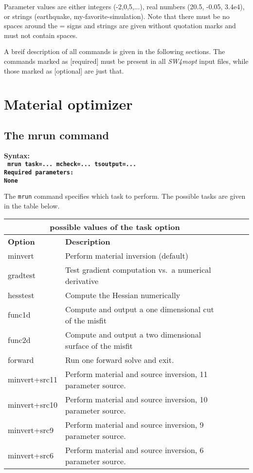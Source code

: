 \documentclass[12pt]{report}
\begin{document}
Parameter values are either integers (-2,0,5,...), real numbers (20.5, -0.05, 3.4e4), or strings
(earthquake, my-favorite-simulation). Note that there must be no spaces around the = signs and
strings are given without quotation marks and must not contain spaces. 

A breif description of all commands is given in the following sections. The commands marked as
[required] must be present in all \emph{SW4mopt} input files, while those marked as [optional] are just
that. 

\section{Material optimizer}

\subsection{The mrun command}\label{sec:mrun}
\begin{flushleft}\bf
Syntax:\\
\tt
mrun task=... mcheck=... tsoutput=... 
\\
\bf Required parameters:\\
\rm
None
\end{flushleft}
The \verb+mrun+ command specifies which task to perform. The possible tasks are
given in the table below. 
\begin{center}
\begin{tabular}{|l|p{8cm}|l|l|l|} \hline
\multicolumn{2}{|c|}{\bf possible values of the task option}\\ \hline
{\bf Option} & {\bf Description}           \\ \hline 
\hline
minvert     & Perform material inversion (default) \\ \hline
gradtest    & Test gradient computation vs.~a numerical derivative \\ \hline
hesstest    & Compute the Hessian numerically  \\ \hline
func1d      & Compute and output a one dimensional cut of the misfit \\ \hline
func2d      & Compute and output a two dimensional surface of the misfit \\ \hline
forward     & Run one forward solve and exit. \\ \hline
minvert+src11& Perform material and source inversion, 11 parameter source. \\ \hline
minvert+src10& Perform material and source inversion, 10 parameter source. \\ \hline
minvert+src9& Perform material and source inversion, 9 parameter source. \\ \hline
minvert+src6& Perform material and source inversion, 6 parameter source. \\ \hline
\end{tabular}
\end{center}
\end{document}
